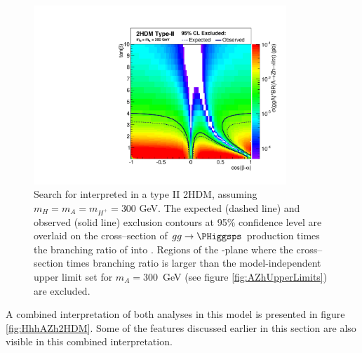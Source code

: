 \begin{figure}[h!]
\begin{center}
\includegraphics[width=0.85\textwidth]{Hhh/Plots/AZh2HDM.pdf}
\caption{Search for \AtoZhtolltautau interpreted in a type II 
2HDM, assuming $m_{H} = m_{A} = m_{H^{+}} = 300$ GeV. The expected (dashed line)
and observed (solid line) exclusion contours at 95\% confidence level are overlaid
on the cross--section of $gg\rightarrow \PHiggsps$ production
times the branching ratio of \PHiggsps into \Zhtolltautau.
Regions of the \cosba-\tanb plane where the cross--section times branching
ratio is larger than the model-independent upper limit set for $m_{A} = 300 $~GeV 
(see figure \ref{fig:AZhUpperLimits}) are excluded.}
\label{fig:AZh2HDMOverlaid}
\end{center}
\end{figure}

A combined interpretation of both analyses in this model is presented
in figure \ref{fig:HhhAZh2HDM}. Some of the features discussed earlier
in this section are also visible in this combined interpretation.

